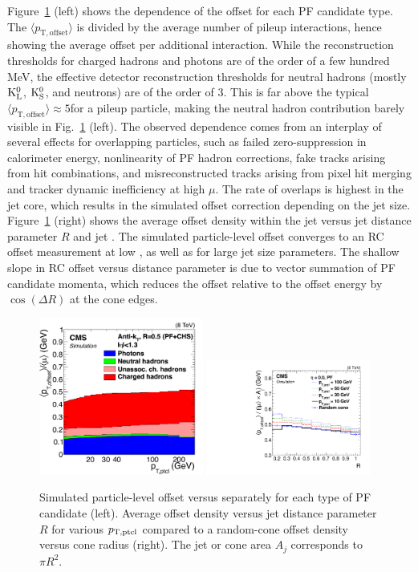 \documentclass[11pt,twoside,a4paper,cmspaper,final,collab]{cms-tdr}
\begin{document}
Figure~\ref{fig:l1pf} (left) shows the \pt dependence of the offset for each PF candidate type. The $\langle p_\mathrm{T, offset}\rangle$ is divided
by the average number of pileup interactions, hence showing the average offset per additional interaction. While the reconstruction thresholds for charged hadrons and photons are of the order of a few hundred MeV, the effective detector reconstruction thresholds for neutral hadrons (mostly $\mathrm{K^0_L}$, $\mathrm{K^0_S}$, and neutrons) are of the order of 3\GeV. This is far above the typical $\langle p_\mathrm{T, offset}\rangle\approx 5$\GeV for a pileup particle, making the neutral hadron contribution barely visible in Fig.~\ref{fig:l1pf} (left).
The observed \pt dependence comes from an interplay of several effects for overlapping particles, such as failed zero-suppression in calorimeter energy, nonlinearity of PF hadron corrections, fake tracks arising from hit combinations, and misreconstructed tracks arising from pixel hit merging and tracker dynamic inefficiency at high $\mu$.
The rate of overlaps is highest in the jet core, which results in the simulated offset correction depending on the jet size. Figure~\ref{fig:l1pf} (right) shows the average offset density within the jet versus jet distance parameter $R$ and jet \pt. The simulated particle-level offset converges to an RC offset measurement at low \pt, as well as for large jet size parameters. The shallow slope in RC offset versus distance parameter is
due to vector summation of PF candidate momenta, which reduces the offset \pt relative to the offset energy by $\cos(\Delta R)$ at the cone edges.

\begin{figure}[htbp!]
\centering
\includegraphics[width=0.48\textwidth]{Figure_006-a.pdf}
\includegraphics[width=0.48\textwidth]{Figure_006-b.pdf}
\caption{\label{fig:l1pf}
Simulated particle-level offset versus \pt separately for each type of PF candidate (left).
Average \pt offset density versus jet distance parameter $R$ for various $p_{\mathrm{T},\rm ptcl}$ compared to a random-cone offset density versus cone radius (right). The jet or cone area $A_j$ corresponds to $\pi R^2$.}
\end{figure}
\end{document}
